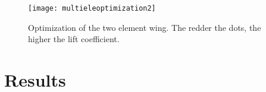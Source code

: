   \begin{figure}
    \texttt{[image: multieleoptimization2]}
    \label{fig:multieleoptimization}
    \caption{Optimization of the two element wing. The redder the dots, the higher the lift coefficient.}
  \end{figure}

\section{Results}
